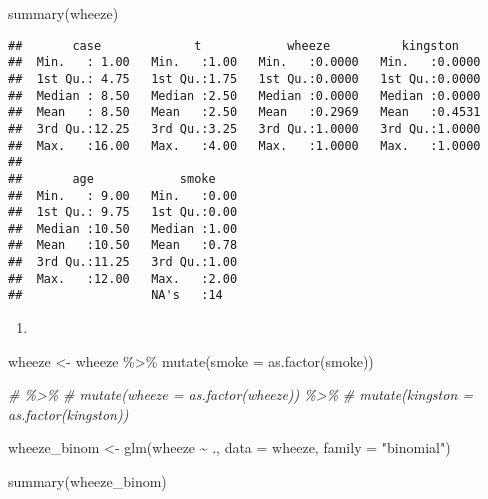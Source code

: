 \documentclass[
]{article}
\newenvironment{Shaded}{\begin{snugshade}}{\end{snugshade}}
\newcommand{\AttributeTok}[1]{\textcolor[rgb]{0.77,0.63,0.00}{#1}}
\newcommand{\CommentTok}[1]{\textcolor[rgb]{0.56,0.35,0.01}{\textit{#1}}}
\newcommand{\FunctionTok}[1]{\textcolor[rgb]{0.00,0.00,0.00}{#1}}
\newcommand{\NormalTok}[1]{#1}
\newcommand{\OtherTok}[1]{\textcolor[rgb]{0.56,0.35,0.01}{#1}}
\newcommand{\SpecialCharTok}[1]{\textcolor[rgb]{0.00,0.00,0.00}{#1}}
\newcommand{\StringTok}[1]{\textcolor[rgb]{0.31,0.60,0.02}{#1}}
\providecommand{\tightlist}{%
  \setlength{\itemsep}{0pt}\setlength{\parskip}{0pt}}
\begin{document}
\begin{Shaded}
\begin{Highlighting}[]
\FunctionTok{summary}\NormalTok{(wheeze)}
\end{Highlighting}
\end{Shaded}

\begin{verbatim}
##       case             t            wheeze          kingston     
##  Min.   : 1.00   Min.   :1.00   Min.   :0.0000   Min.   :0.0000  
##  1st Qu.: 4.75   1st Qu.:1.75   1st Qu.:0.0000   1st Qu.:0.0000  
##  Median : 8.50   Median :2.50   Median :0.0000   Median :0.0000  
##  Mean   : 8.50   Mean   :2.50   Mean   :0.2969   Mean   :0.4531  
##  3rd Qu.:12.25   3rd Qu.:3.25   3rd Qu.:1.0000   3rd Qu.:1.0000  
##  Max.   :16.00   Max.   :4.00   Max.   :1.0000   Max.   :1.0000  
##                                                                  
##       age            smoke     
##  Min.   : 9.00   Min.   :0.00  
##  1st Qu.: 9.75   1st Qu.:0.00  
##  Median :10.50   Median :1.00  
##  Mean   :10.50   Mean   :0.78  
##  3rd Qu.:11.25   3rd Qu.:1.00  
##  Max.   :12.00   Max.   :2.00  
##                  NA's   :14
\end{verbatim}

\begin{enumerate}
\def\labelenumi{(\alph{enumi})}
\tightlist
\item
\end{enumerate}

\begin{Shaded}
\begin{Highlighting}[]
\NormalTok{wheeze }\OtherTok{\textless{}{-}}\NormalTok{ wheeze }\SpecialCharTok{\%\textgreater{}\%}
  \FunctionTok{mutate}\NormalTok{(}\AttributeTok{smoke =} \FunctionTok{as.factor}\NormalTok{(smoke)) }

\CommentTok{\# \%\textgreater{}\%}
\CommentTok{\#   mutate(wheeze = as.factor(wheeze)) \%\textgreater{}\%}
\CommentTok{\#   mutate(kingston = as.factor(kingston))}


\NormalTok{wheeze\_binom }\OtherTok{\textless{}{-}} \FunctionTok{glm}\NormalTok{(wheeze }\SpecialCharTok{\textasciitilde{}}\NormalTok{ ., }\AttributeTok{data =}\NormalTok{ wheeze, }\AttributeTok{family =} \StringTok{"binomial"}\NormalTok{)}

\FunctionTok{summary}\NormalTok{(wheeze\_binom)}
\end{Highlighting}
\end{Shaded}
\end{document}
